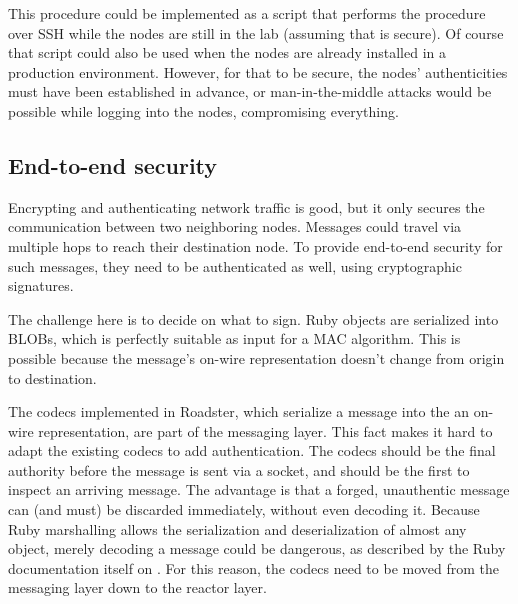 This procedure could be implemented as a script that performs the procedure
over \gls{SSH} while the nodes are still in the
lab (assuming that is secure). Of course that script could also be used when
the nodes are already installed in a production environment. However, for that to be
secure, the nodes' authenticities must have been established in advance, or
man-in-the-middle attacks would be possible while logging into the nodes,
compromising everything.



% 
% 
% 


\subsection{End-to-end security}
Encrypting and authenticating network traffic is good, but it only secures the
communication between two neighboring nodes. Messages could travel via multiple
hops to reach their destination node. To provide end-to-end security for such
messages, they need to be authenticated as well, using cryptographic
signatures.

The challenge here is to decide on what to sign. Ruby objects are serialized
into \glspl{BLOB}, which is perfectly suitable as input for a \gls{MAC} algorithm.
This is possible because the message's on-wire
representation doesn't change from origin to destination.

The codecs implemented in Roadster, which serialize a message into the an
on-wire representation, are part of the messaging layer. This fact makes it
hard to adapt the existing codecs to add authentication. The codecs should be
the final authority before the message is sent via a socket, and should be the
first to inspect an arriving message. The advantage is that a forged,
unauthentic message can (and must) be discarded immediately, without even
decoding it.  Because Ruby marshalling allows the serialization and
deserialization of almost any object, merely decoding a message could be
dangerous, as described by the Ruby documentation itself on \cite[Security
considerations]{rb:doc:marshal}.  For this reason, the codecs need to be moved
from the messaging layer down to the reactor layer.


